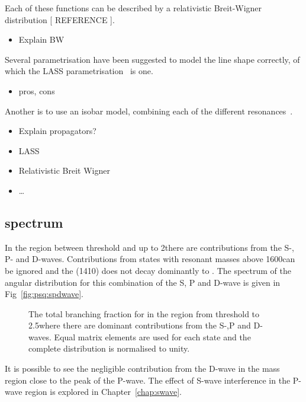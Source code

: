 Each of these functions can be described by a relativistic Breit-Wigner  distribution [ REFERENCE ].
\begin{itemize}
    \item Explain BW
\end{itemize}
Several parametrisation have been suggested to model the \kpi line shape correctly, of which the LASS parametrisation~\cite{Aston:179353} is one. 
\begin{itemize}
\item pros, cons 
\end{itemize}
Another is to use an isobar model, combining each of the different resonances~\cite{PhysRevLett.89.121801}.

\begin{itemize}
\item Explain propagators?
\item LASS
\item Relativistic Breit Wigner
\item \dots
\end{itemize}

\subsection{\psq spectrum}

In the \psq region between threshold and up to 2\gevgevcccc there are contributions from the S-, P- and D-waves.
Contributions from \Kstarz states with resonant masses above 1600\mev can be ignored and the \Kstarzo(1410) does 
not decay dominantly to \kpi.
The \psq spectrum of the angular distribution for this combination of the S, P and D-wave is given in
Fig~\ref{fig:psq:spdwave}.
\begin{figure}[tbp]
\centering
{}
\caption{ The total branching fraction for \BdToKpill in the region from threshold to 2.5\gevgevcccc where there are dominant contributions
from the S-,P and D-waves. Equal matrix elements are used for each state and the complete distribution is normalised to unity.
  ~\label{fig:psq:spdpwave} }
\end{figure}
It is possible to see the negligible contribution from the D-wave in the mass region close to the peak of the P-wave. 
The effect of S-wave interference in the P-wave region is explored in Chapter~\ref{chap:swave}.


